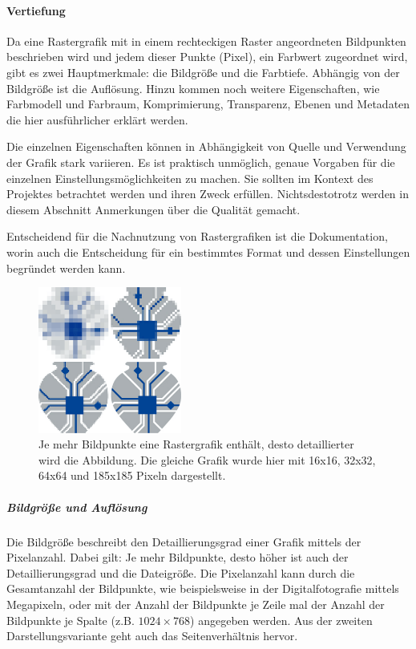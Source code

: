 \paragraph{Vertiefung}
Da eine Rastergrafik mit in einem rechteckigen Raster angeordneten Bildpunkten beschrieben wird und jedem dieser Punkte (Pixel), ein Farbwert zugeordnet wird, gibt es zwei Hauptmerkmale: die Bildgröße und die Farbtiefe. Abhängig von der Bildgröße ist die Auflösung. Hinzu kommen noch weitere Eigenschaften, wie Farbmodell und Farbraum, Komprimierung, Transparenz, Ebenen und Metadaten die hier ausführlicher erklärt werden. 

Die einzelnen Eigenschaften können in Abhängigkeit von Quelle und Verwendung der Grafik stark variieren. Es ist praktisch unmöglich, genaue Vorgaben für die einzelnen Einstellungsmöglichkeiten zu machen. Sie sollten im Kontext des Projektes betrachtet werden und ihren Zweck erfüllen. Nichtsdestotrotz werden in diesem Abschnitt Anmerkungen über die Qualität gemacht.

Entscheidend für die Nachnutzung von Rastergrafiken ist die Dokumentation, worin auch die Entscheidung für ein bestimmtes Format und dessen Einstellungen begründet werden kann.

\begin{figure}
  \begin{center}
    \includegraphics[width=0.42\textwidth]{bilder/RG_bildpunkte}
  \end{center}
  \caption{Je mehr Bildpunkte eine Rastergrafik enthält, desto detaillierter wird die Abbildung. Die gleiche Grafik wurde hier mit 16x16, 32x32, 64x64 und 185x185 Pixeln dargestellt.}
\end{figure}\label{RG_Bildgroesse}
\subparagraph{Bildgröße und Auflösung} Die Bildgröße beschreibt den Detaillierungsgrad einer Grafik mittels der Pixelanzahl. Dabei gilt: Je mehr Bildpunkte, desto höher ist auch der Detaillierungsgrad und die Dateigröße. Die Pixelanzahl kann durch die Gesamtanzahl der Bildpunkte, wie beispielsweise in der Digitalfotografie mittels Megapixeln, oder mit der Anzahl der Bildpunkte je Zeile mal der Anzahl der Bildpunkte je Spalte (z.B. $1024 \times 768$) angegeben werden. Aus der zweiten Darstellungsvariante geht auch das Seitenverhältnis hervor.

